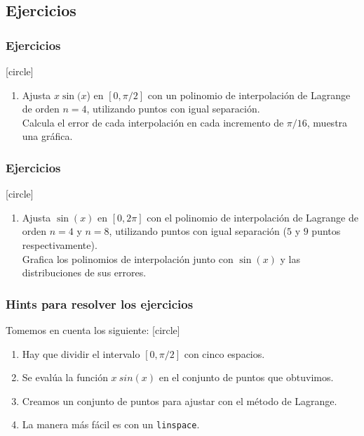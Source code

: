 \subsection{Ejercicios}
\begin{frame}
\frametitle{Ejercicios}
[circle]
\begin{enumerate}
\item Ajusta $x \sin(x$) en $[0, \pi/2]$ con un polinomio de interpolación de Lagrange de orden $n = 4$, utilizando puntos con igual separación.
\\
\bigskip
Calcula el error de cada interpolación en cada incremento de $\pi/16$, muestra una gráfica.
\seti
\end{enumerate}
\end{frame}
\begin{frame}
\frametitle{Ejercicios}
[circle]
\begin{enumerate}
\conti
\item Ajusta $\sin(x)$ en $[0, 2\pi]$ con el polinomio de interpolación de Lagrange de orden $n = 4$ y $n = 8$, utilizando puntos con igual separación ($5$ y $9$ puntos respectivamente). 
\\
\bigskip
Grafica los polinomios de interpolación junto con $\sin(x)$ y las distribuciones de sus errores.
\end{enumerate}
\end{frame}
\begin{frame}[fragile]
\frametitle{Hints para resolver los ejercicios}
Tomemos en cuenta los siguiente:
[circle]
\begin{enumerate}[<+->]
\item Hay que dividir el intervalo $[0,\pi/2]$ con cinco espacios.
\item Se evalúa la función $x \: sin(x)$ en el conjunto de puntos que obtuvimos.
\item Creamos un conjunto de puntos para ajustar con el método de Lagrange.
\item La manera más fácil es con un \texttt{linspace}.
\end{enumerate}
\end{frame}
